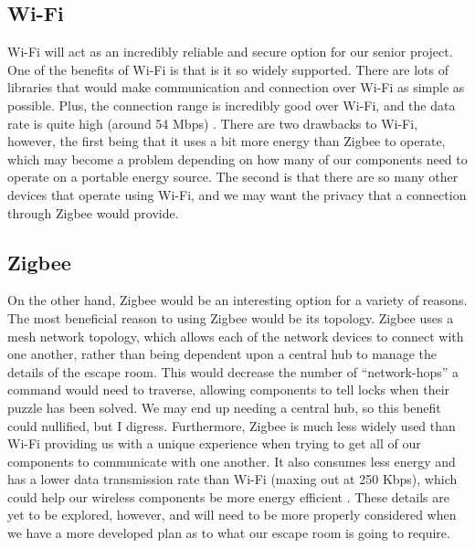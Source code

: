 \documentclass[conference]{IEEEtran}
\begin{document}
\subsection*{Wi-Fi}
Wi-Fi will act as an incredibly reliable and secure option for our senior project. One of the benefits of Wi-Fi
is that is it so widely supported. There are lots of libraries that would make communication and connection over
Wi-Fi as simple as possible. Plus, the connection range is incredibly good over Wi-Fi, and the data rate is quite high
(around 54 Mbps) \cite{wifiVsZigbee}. There are two drawbacks to Wi-Fi, however, the first being that it uses a bit more energy than Zigbee
to operate, which may become a problem depending on how many of our components need to operate on a portable energy
source. The second is that there are so many other devices that operate using Wi-Fi, and we may want the privacy that
a connection through Zigbee would provide.

\subsection*{Zigbee}
On the other hand, Zigbee would be an interesting option for a variety of reasons. The most beneficial reason to using
Zigbee would be its topology. Zigbee uses a mesh network topology, which allows each of the network devices to connect with
one another, rather than being dependent upon a central hub to manage the details of the escape room. This would decrease
the number of ``network-hops'' a command would need to traverse, allowing components to tell locks when their puzzle has been
solved. We may end up needing a central hub, so this benefit could nullified, but I digress. Furthermore, Zigbee is much less
widely used than Wi-Fi providing us with a unique experience when trying to get all of our components to communicate
with one another. It also consumes less energy and has a lower data transmission rate than Wi-Fi (maxing out at 250 Kbps),
which could help our wireless components be more energy efficient \cite{wifiVsZigbee}. These details are yet to be explored,
however, and will need to be more properly considered when we have a more developed plan as to what our escape room is going to require.
\end{document}
